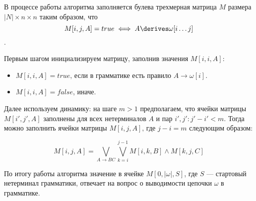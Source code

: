 В процессе работы алгоритма заполняется булева трехмерная матрица $M$ размера $|N| \times n \times n$ таким образом, что $$M[i, j, A] = true \iff A \derives \omega[i \dots j]$$.

Первым шагом инициализируем матрицу, заполнив значения $M[i, i, A]$:

\begin{itemize}
  \item $M[i, i, A] = true \text{, если в грамматике есть правило } A \to \omega[i]$.
  \item $M[i, i, A] = false$, иначе.
\end{itemize}

Далее используем динамику: на шаге $m > 1$ предполагаем, что ячейки матрицы $M[i', j', A]$ заполнены для всех нетерминалов $A$ и пар $i', j': j' - i' < m$.
Тогда можно заполнить ячейки матрицы $M[i, j, A] \text{, где } j - i = m$ следующим образом:

\[ M[i, j, A] = \bigvee_{A \to B C}^{}{\bigvee_{k=i}^{j-1}{M[i, k, B] \wedge M[k, j, C]}} \]

По итогу работы алгоритма значение в ячейке $M[0, |\omega|, S]$, где $S$ --- стартовый нетерминал грамматики, отвечает на вопрос о выводимости цепочки $\omega$ в грамматике.

